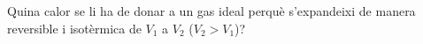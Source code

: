 \begin{exr}
Quina calor se li ha de donar a un gas ideal perquè s'expandeixi de manera reversible i isotèrmica de $V_1$ a $V_2$ ($V_2>V_1$)?
\end{exr}
